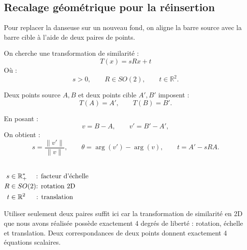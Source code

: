 \documentclass[11pt,a4paper]{article}
\begin{document}
\subsection{Recalage géométrique pour la réinsertion}
Pour replacer la danseuse sur un nouveau fond, on aligne la barre source avec la barre cible à l'aide de deux paires de points.

On cherche une transformation de similarité :
\[
    T(x) = sRx + t
\]
Où :
\[
    s > 0,\qquad R \in SO(2),\qquad t \in \mathbb{R}^2.
\]

Deux points source \(A,B\) et deux points cible \(A',B'\) imposent :
\[
    T(A)=A',
    \qquad
    T(B)=B'.
\]

En posant :
\[
    v = B-A,
    \qquad
    v' = B'-A',
\]
On obtient :
\[
    s = \frac{\|v'\|}{\|v\|},
    \qquad
    \theta = \arg(v')-\arg(v),
    \qquad
    t = A' - sRA.
\]

\begin{center}
\\[-0.4em]
{\footnotesize
    \(
        \begin{aligned}
            s &\in \mathbb{R}^{*}_{+} \hspace{1.35em} \text{: facteur d'échelle} \\
            R &\in SO(2) \text{: rotation 2D} \\
            t &\in \mathbb{R}^2 \hspace{1.6em} \text{: translation}
        \end{aligned}
    \)
}
\end{center}

Utiliser seulement deux paires suffit ici car la transformation de similarité en 2D que nous avons réalisée possède exactement 4 degrés de liberté : rotation, échelle et translation.  
Deux correspondances de deux points donnent exactement 4 équations scalaires.
\end{document}
